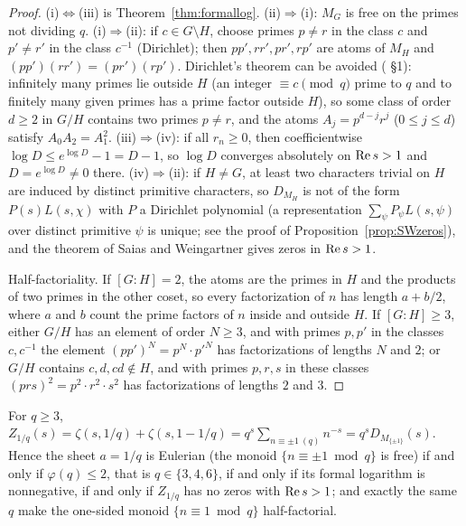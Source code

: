 \begin{proof}
(i)$\Leftrightarrow$(iii) is Theorem~\ref{thm:formallog}. (ii)$\Rightarrow$(i): $M_G$ is free on the primes not dividing $q$.
(i)$\Rightarrow$(ii): if $c\in G\setminus H$, choose primes $p\ne r$ in the class $c$ and $p'\ne r'$ in the class $c^{-1}$ (Dirichlet); then $pp',rr',pr',rp'$ are atoms of $M_H$ and $(pp')(rr')=(pr')(rp')$. Dirichlet's theorem can be avoided ( §1): infinitely many primes lie outside $H$ (an integer $\equiv c\pmod q$ prime to $q$ and to finitely many given primes has a prime factor outside $H$), so some class of order $d\ge2$ in $G/H$ contains two primes $p\ne r$, and the atoms $A_j=p^{d-j}r^j$ ($0\le j\le d$) satisfy $A_0A_2=A_1^2$.
(iii)$\Rightarrow$(iv): if all $r_n\ge0$, then coefficientwise $\log D\le e^{\log D}-1=D-1$, so $\log D$ converges absolutely on $\operatorname{Re} s>1$ and $D=e^{\log D}\ne0$ there.
(iv)$\Rightarrow$(ii): if $H\ne G$, at least two characters trivial on $H$ are induced by distinct primitive characters, so $D_{M_H}$ is not of the form $P(s)L(s,\chi)$ with $P$ a Dirichlet polynomial (a representation $\sum_\psi P_\psi L(s,\psi)$ over distinct primitive $\psi$ is unique; see the proof of Proposition~\ref{prop:SWzeros}), and the theorem of Saias and Weingartner gives zeros in $\operatorname{Re} s>1$.

Half-factoriality. If $[G:H]=2$, the atoms are the primes in $H$ and the products of two primes in the other coset, so every factorization of $n$ has length $a+b/2$, where $a$ and $b$ count the prime factors of $n$ inside and outside $H$. If $[G:H]\ge3$, either $G/H$ has an element of order $N\ge3$, and with primes $p,p'$ in the classes $c,c^{-1}$ the element $(pp')^N=p^N\cdot p'^N$ has factorizations of lengths $N$ and $2$; or $G/H$ contains $c,d,cd\notin H$, and with primes $p,r,s$ in these classes $(prs)^2=p^2\cdot r^2\cdot s^2$ has factorizations of lengths $2$ and $3$.
\end{proof}

\begin{proposition}[the even sheets at $a=1/q$]\label{prop:evensheets}
For $q\ge3$, $Z_{1/q}(s)=\zeta(s,1/q)+\zeta(s,1-1/q)=q^s\sum_{n\equiv\pm1\ (q)}n^{-s}=q^sD_{M_{\{\pm1\}}}(s)$.
Hence the sheet $a=1/q$ is Eulerian (the monoid $\{n\equiv\pm1\bmod q\}$ is free) if and only if $\varphi(q)\le2$, that is $q\in\{3,4,6\}$, if and only if its formal logarithm is nonnegative, if and only if $Z_{1/q}$ has no zeros with $\operatorname{Re} s>1$; and exactly the same $q$ make the one-sided monoid $\{n\equiv1\bmod q\}$ half-factorial.
\end{proposition}

